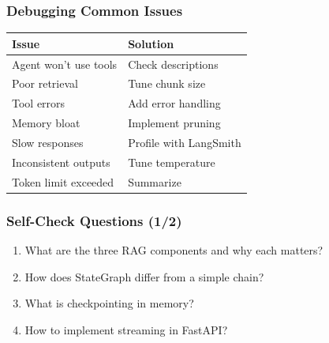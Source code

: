 \documentclass[aspectratio=169,11pt]{beamer}
\begin{document}
\begin{frame}
  \frametitle{Debugging Common Issues}

  \begin{tabular}{|l|l|}
    \toprule
    \textbf{Issue} & \textbf{Solution} \\
    \midrule
    Agent won't use tools & Check descriptions \\
    Poor retrieval & Tune chunk size \\
    Tool errors & Add error handling \\
    Memory bloat & Implement pruning \\
    Slow responses & Profile with LangSmith \\
    Inconsistent outputs & Tune temperature \\
    Token limit exceeded & Summarize \\
    \bottomrule
  \end{tabular}
\end{frame}

\begin{frame}
  \frametitle{Self-Check Questions (1/2)}

  \begin{enumerate}
    \item What are the three RAG components and why each matters?
    \vspace{0.3cm}
    \item How does StateGraph differ from a simple chain?
    \vspace{0.3cm}
    \item What is checkpointing in memory?
    \vspace{0.3cm}
    \item How to implement streaming in FastAPI?
    \vspace{0.3cm}
  \end{enumerate}
\end{frame}
\end{document}
